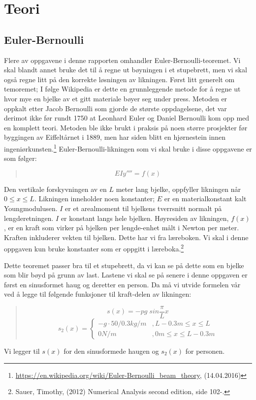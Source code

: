 \section{Teori}

\subsection{Euler-Bernoulli}
Flere av oppgavene i denne rapporten omhandler Euler-Bernoulli-teoremet. Vi skal blandt annet bruke det til å regne ut bøyningen i et stupebrett, men vi skal også regne litt på den korrekte løsningen av likningen. Først litt generelt om temoremet; I følge Wikipedia er dette en grunnleggende metode for å regne ut hvor mye en bjelke av et gitt materiale bøyer seg under press. Metoden er oppkalt etter Jacob Bernoulli som gjorde de største oppdagelsene, det var derimot ikke før rundt 1750 at Leonhard Euler og Daniel Bernoulli kom opp med en komplett teori. Metoden ble ikke brukt i praksis på noen større prosjekter før byggingen av Eiffeltårnet i 1889, men har siden blitt en hjørnestein innen ingeniørkunsten.\footnote{\url{https://en.wikipedia.org/wiki/Euler-Bernoulli_beam_theory}, (14.04.2016)} Euler-Bernoulli-likningen som vi skal bruke i disse oppgavene er som følger:
\begin{quote}
\begin{equation}
EIy''''=f(x)
\end{equation}
\end{quote}
Den vertikale forskyvningen av en $L$ meter lang bjelke, oppfyller likningen når $0\leq x\leq L$. Likningen inneholder noen konstanter; $E$ er en materialkonstant kalt Youngmodulusen. $I$ er et arealmoment til bjelkens tverrsnitt normalt på lengderetningen. $I$ er konstant langs hele bjelken. Høyresiden av likningen, $f(x)$, er en kraft som virker på bjelken per lengde-enhet målt i Newton per meter. Kraften inkluderer vekten til bjelken. Dette har vi fra læreboken. Vi skal i denne oppgaven kun bruke konstanter som er oppgitt i læreboka.\footnote{Sauer, Timothy, (2012) Numerical Analysis second edition, side 102-.}

Dette teoremet passer bra til et stupebrett, da vi kan se på dette som en bjelke som blir bøyd på grunn av last. Lastene vi skal se på senere i denne oppgaven er først en sinusformet haug og deretter en person. Da må vi utvide formelen vår ved å legge til følgende funksjoner til kraft-delen av likningen:
\begin{quote}
\begin{equation}
s(x)=-pg\;sin\frac{\pi}{L}x
\end{equation}
\begin{equation}
s_2(x)=\begin{cases}
	-g\cdot{50/0.3kg/m} & ,L-0.3m\leq x\leq L\\
	0N/m & ,0m\leq x\leq L-0.3m
	\end{cases}
\end{equation}
\end{quote}
Vi legger til $s(x)$ for den sinusformede haugen og $s_2(x)$ for personen. 

